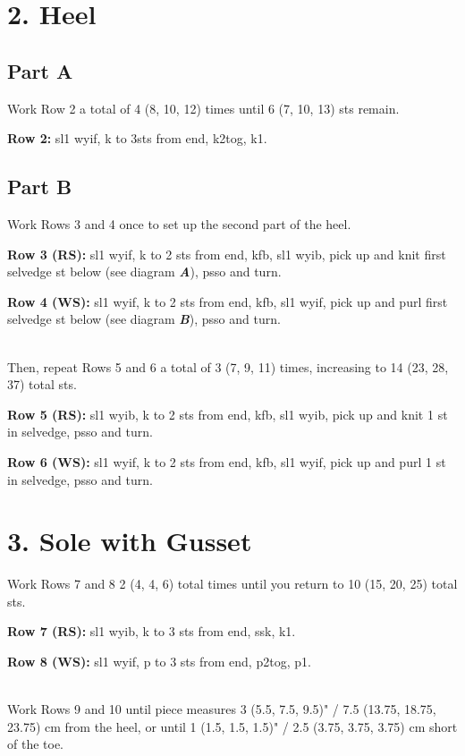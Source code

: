 \documentclass[12pt]{article}
\newcommand{\vocab}[1]{\emph{\textbf{#1}}} %
\newcommand{\rowDir}[1]{\textbf{#1:}} %
\begin{document}
\section*{2. Heel}

\subsection*{Part A}
Work Row 2 a total of 4 (8, 10, 12) times until 6 (7, 10, 13) sts remain.

\rowDir{Row 2} sl1 wyif, k to 3sts from end, k2tog, k1.

\subsection*{Part B}

Work Rows 3 and 4 once to set up the second part of the heel.

\rowDir{Row 3 (RS)}  sl1 wyif, k to 2 sts from end, kfb, sl1 wyib, pick up and knit first selvedge st below (see diagram \vocab{A}), psso and turn.

\rowDir{Row 4 (WS)} sl1 wyif, k to 2 sts from end, kfb, sl1 wyif, pick up and purl first selvedge st below (see diagram \vocab{B}), psso and turn.

~\\
Then, repeat Rows 5 and 6 a total of 3 (7, 9, 11) times, increasing to 14 (23, 28, 37) total sts.

\rowDir{Row 5 (RS)} sl1 wyib, k to 2 sts from end, kfb, sl1 wyib, pick up and knit 1 st in selvedge, psso and turn.

\rowDir{Row 6 (WS)} sl1 wyif, k to 2 sts from end, kfb, sl1 wyif, pick up and purl 1 st in selvedge, psso and turn.

\section*{3. Sole with Gusset}

Work Rows 7 and 8 2 (4, 4, 6) total times until you return to 10 (15, 20, 25) %
total sts.

\rowDir{Row 7 (RS)} sl1 wyib, k to 3 sts from end, ssk, k1.

\rowDir{Row 8 (WS)}  sl1 wyif, p to 3 sts from end, p2tog, p1. 

~\\
Work Rows 9 and 10 until piece measures 3 (5.5, 7.5, 9.5)" / 7.5 (13.75, 18.75, 23.75) cm from the heel, or until 1 (1.5, 1.5, 1.5)" / 2.5 (3.75, 3.75, 3.75) cm short of the toe.
\end{document}
